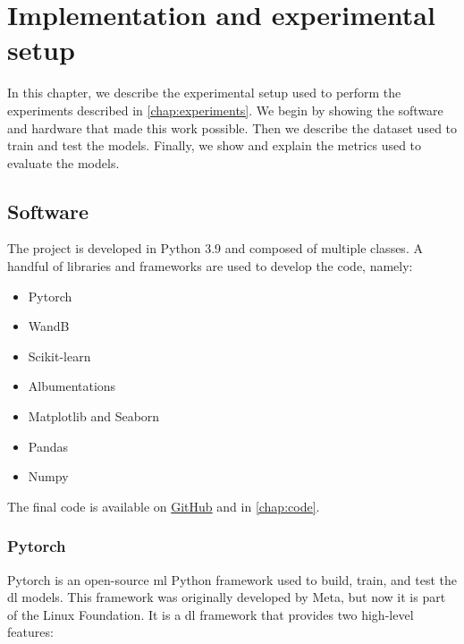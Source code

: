 \chapter{Implementation and experimental setup}
\label{chap:dataset}
In this chapter, we describe the experimental setup used to perform the experiments described in \autoref{chap:experiments}. We begin by showing the software and hardware that made this work possible. Then we describe the dataset used to train and test the models. Finally, we show and explain the metrics used to evaluate the models.

\section{Software}


    The project is developed in Python 3.9 and composed of multiple classes. A handful of libraries and frameworks are used to develop the code, namely:

    \begin{itemize}
        \item Pytorch \cite{pytorch}
        \item WandB \cite{wandb}
        \item Scikit-learn
        \item Albumentations
        \item Matplotlib and Seaborn
        \item Pandas
        \item Numpy
    \end{itemize}

    The final code is available on \href{https://github.com/aXhyra/Active-Learning-for-Visual-Anomaly-Detection-Applied-to-Mobile-Robots}{GitHub} and in \autoref{chap:code}.

    \subsection{Pytorch}
    Pytorch \cite{pytorch} is an open-source \acrfull{ml} Python framework used to build, train, and test the \acrshort{dl} models. This framework was originally developed by Meta, but now it is part of the Linux Foundation. It is a \acrfull{dl} framework that provides two high-level features:

